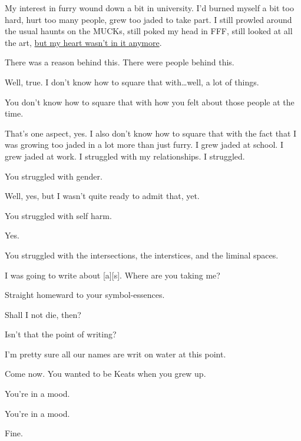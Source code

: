 \begin{leftcolumn}
My interest in furry wound down a bit in university. I'd burned myself a bit too hard, hurt too many people, grew too jaded to take part. I still prowled around the usual haunts on the MUCKs, still poked my head in FFF, still looked at all the art, \href{https://adjectivespecies.com/2012/03/21/makyos-kaddish/}{but my heart wasn't in it anymore}.

\begin{ally}
There was a reason behind this. There were people behind this.
\end{ally}
Well, true. I don't know how to square that with\ldots{}well, a lot of things.

\begin{ally}
You don't know how to square that with how you felt about those people at the time.
\end{ally}
That's one aspect, yes. I also don't know how to square that with the fact that I was growing too jaded in a lot more than just furry. I grew jaded at school. I grew jaded at work. I struggled with my relationships. I struggled.

\begin{ally}
You struggled with gender.
\end{ally}
Well, yes, but I wasn't quite ready to admit that, yet.

\begin{ally}
You struggled with self harm.
\end{ally}
Yes.

\begin{ally}
You struggled with the intersections, the interstices, and the liminal spaces.
\end{ally}
I was going to write about {[}a{]}{[}s{]}. Where are you taking me?

\begin{ally}
Straight homeward to your symbol-essences.
\end{ally}
Shall I not die, then?

\begin{ally}
Isn't that the point of writing?
\end{ally}
I'm pretty sure all our names are writ on water at this point.

\begin{ally}
Come now. You wanted to be Keats when you grew up.
\end{ally}
You're in a mood.

\begin{ally}
You're in a mood.
\end{ally}
Fine.


\end{leftcolumn}
